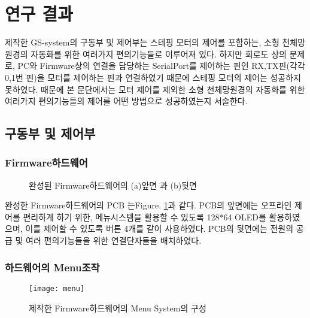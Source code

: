 \section{연구 결과}
 제작한 GS-system의 구동부 및 제어부는 스테핑 모터의 제어를 포함하는, 소형 천체망원경의 자동화를 위한 여러가지 편의기능들로 이루어져 있다. 하지만 회로도 상의 문제로, PC와 Firmware상의 연결을 담당하는 SerialPort를 제어하는 핀인 RX,TX핀(각각 0,1번 핀)을 모터를 제어하는 핀과 연결하였기 때문에 스테핑 모터의 제어는 성공하지 못하였다. 때문에 본 문단에서는 모터 제어를 제외한 소형 천체망원경의 자동화를 위한 여러가지 편의기능들의 제어를 어떤 방법으로 성공하였는지 서술한다.

\subsection{구동부 및 제어부}

\subsubsection{Firmware하드웨어}

	\begin{figure}[ht]
	\begin{center}
	\end{center}
	\caption{완성된 Firmware하드웨어의 (a)앞면 과 (b)뒷면}
	\label{pcb}
	\end{figure}
	
	완성한 Firmware하드웨어의 PCB 는\textrm{Figure}. \ref{pcb}과 같다. PCB의 앞면에는 오프라인 제어를 편리하게 하기 위한, 메뉴시스템을 활용할 수 있도록 128*64 OLED를 활용하였으며, 이를 제어할 수 있도록 버튼 4개를 같이 사용하였다. PCB의 뒷면에는 전원의 공급 및 여러 편의기능들을 위한 연결단자들을 배치하였다.
 
	
	
\subsubsection{하드웨어의 Menu조작}
 
  \begin{figure}[h]
 	\begin{center}
 		\texttt{[image: menu]}
 	\end{center}
 	\caption{제작한 Firmware하드웨어의 Menu System의 구성}
 	\label{menu}
 \end{figure}
 

